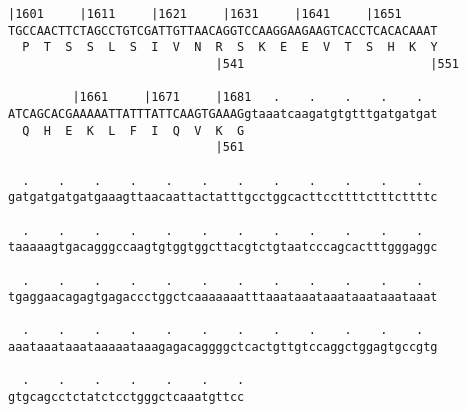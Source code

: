 \documentclass{article}
\begin{document}
\newpage
\begin{Verbatim}[fontfamily=courier]
         |1601     |1611     |1621     |1631     |1641     |1651
TGCCAACTTCTAGCCTGTCGATTGTTAACAGGTCCAAGGAAGAAGTCACCTCACACAAAT
  P  T  S  S  L  S  I  V  N  R  S  K  E  E  V  T  S  H  K  Y
                             |541                          |551

         |1661     |1671     |1681   .    .    .    .    .  
ATCAGCACGAAAAATTATTTATTCAAGTGAAAGgtaaatcaagatgtgtttgatgatgat
  Q  H  E  K  L  F  I  Q  V  K  G                           
                             |561                           

  .    .    .    .    .    .    .    .    .    .    .    .  
gatgatgatgatgaaagttaacaattactatttgcctggcacttccttttctttcttttc

  .    .    .    .    .    .    .    .    .    .    .    .  
taaaaagtgacagggccaagtgtggtggcttacgtctgtaatcccagcactttgggaggc

  .    .    .    .    .    .    .    .    .    .    .    .  
tgaggaacagagtgagaccctggctcaaaaaaatttaaataaataaataaataaataaat

  .    .    .    .    .    .    .    .    .    .    .    .  
aaataaataaataaaaataaagagacaggggctcactgttgtccaggctggagtgccgtg

  .    .    .    .    .    .    .
gtgcagcctctatctcctgggctcaaatgttcc
\end{Verbatim}
\newpage
\end{document}
